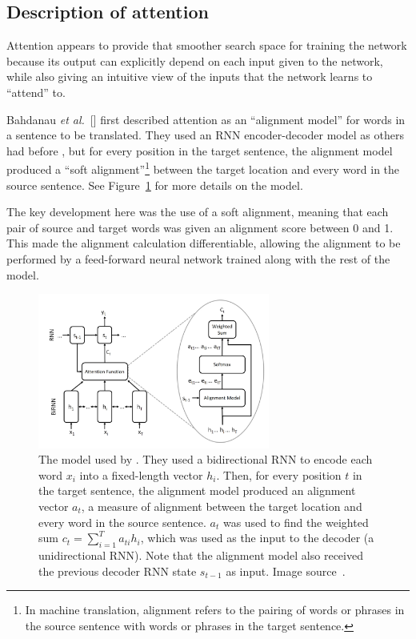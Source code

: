 \documentclass{article}
\newcommand{\etal}{\textit{et al.}}
\begin{document}
\subsection{Description of attention}

Attention appears to provide that smoother search space for training the network because its output can explicitly depend on each input given to the network, while also giving an intuitive view of the inputs that the network learns to ``attend'' to.

Bahdanau \etal~[\citeyear{joint_align_translate}] first described attention as an ``alignment model'' for words in a sentence to be translated. They used an RNN encoder-decoder model as others had before \cite{encoder_decoders}, but for every position in the target sentence, the alignment model produced a ``soft alignment''\footnote{In machine translation, alignment refers to the pairing of words or phrases in the source sentence with words or phrases in the target sentence.} between the target location and every word in the source sentence. See Figure~\ref{figure:rnn_search} for more details on the model.

The key development here was the use of a soft alignment, meaning that each pair of source and target words was given an alignment score between 0 and 1. This made the alignment calculation differentiable, allowing the alignment to be performed by a feed-forward neural network trained along with the rest of the model.

\begin{figure}
    \centering
    \includegraphics[width=3in]{figures/rnn_search.png}
    \caption{The model used by \protect\cite{joint_align_translate}. They used a bidirectional RNN to encode each word $x_i$ into a fixed-length vector $h_i$. Then, for every position $t$ in the target sentence, the alignment model produced an alignment vector $a_t$, a measure of alignment between the target location and every word in the source sentence. $a_t$ was used to find the weighted sum $c_t=\sum_{i=1}^Ta_{ti}h_i$, which was used as the input to the decoder (a unidirectional RNN). Note that the alignment model also received the previous decoder RNN state $s_{t-1}$ as input. Image source~\protect\cite{attention_please}.}\label{figure:rnn_search}
\end{figure}
\end{document}
